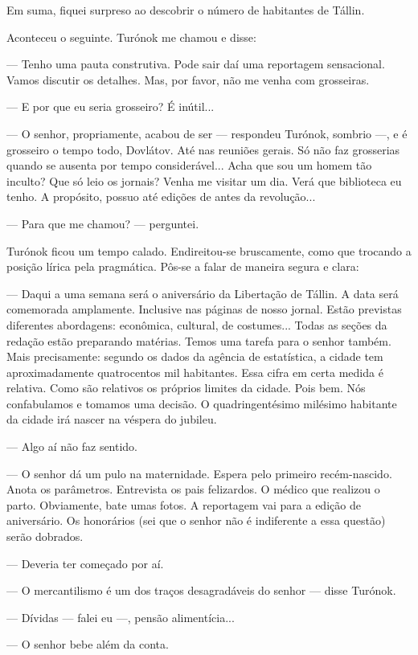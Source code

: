 Em suma, fiquei surpreso ao descobrir o número de habitantes de Tállin.

Aconteceu o seguinte. Turónok me chamou e disse:

--- Tenho uma pauta construtiva. Pode sair daí uma reportagem
sensacional. Vamos discutir os detalhes. Mas, por favor, não me venha
com grosseiras.

--- E por que eu seria grosseiro? É inútil...

--- O senhor, propriamente, acabou de ser --- respondeu Turónok, sombrio
---, e é grosseiro o tempo todo, Dovlátov. Até nas reuniões gerais. Só
não faz grosserias quando se ausenta por tempo considerável... Acha que
sou um homem tão inculto? Que só leio os jornais? Venha me visitar um
dia. Verá que biblioteca eu tenho. A propósito, possuo até edições de
antes da revolução...

--- Para que me chamou? --- perguntei.

Turónok ficou um tempo calado. Endireitou-se bruscamente, como que
trocando a posição lírica pela pragmática. Pôs-se a falar de maneira
segura e clara:

--- Daqui a uma semana será o aniversário da Libertação de Tállin. A
data será comemorada amplamente. Inclusive nas páginas de nosso jornal.
Estão previstas diferentes abordagens: econômica, cultural, de
costumes... Todas as seções da redação estão preparando matérias. Temos
uma tarefa para o senhor também. Mais precisamente: segundo os dados da
agência de estatística, a cidade tem aproximadamente quatrocentos mil
habitantes. Essa cifra em certa medida é relativa. Como são relativos os
próprios limites da cidade. Pois bem. Nós confabulamos e tomamos uma
decisão. O quadringentésimo milésimo habitante da cidade irá nascer na
véspera do jubileu.

--- Algo aí não faz sentido.

--- O senhor dá um pulo na maternidade. Espera pelo primeiro
recém-nascido. Anota os parâmetros. Entrevista os pais felizardos. O
médico que realizou o parto. Obviamente, bate umas fotos. A reportagem
vai para a edição de aniversário. Os honorários (sei que o senhor não é
indiferente a essa questão) serão dobrados.

--- Deveria ter começado por aí.

--- O mercantilismo é um dos traços desagradáveis do senhor --- disse
Turónok.

--- Dívidas --- falei eu ---, pensão alimentícia...

--- O senhor bebe além da conta.


